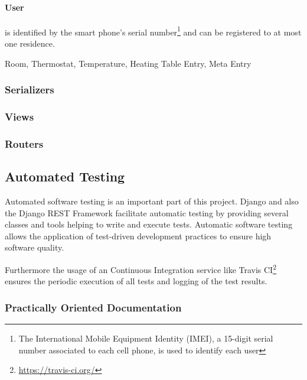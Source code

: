 \paragraph{User}

is identified by the smart phone's serial number\footnote{The International Mobile Equipment Identity (IMEI), a 15-digit serial number associated to each cell phone, is used to identify each user} and can be registered to at most one residence. 

Room, Thermostat, Temperature, Heating Table Entry, Meta Entry




\subsubsection{Serializers}

\subsubsection{Views}

\subsubsection{Routers}



\subsection{Automated Testing}

Automated software testing is an important part of this project. Django and also the Django REST Framework facilitate automatic testing by providing several classes and tools helping to write and execute tests. Automatic software testing allows the application of test-driven development practices to ensure high software quality.

Furthermore the usage of an Continuous Integration service like Travis CI\footnote{\url{https://travis-ci.org/}} ensures the periodic execution of all tests and logging of the test results.

\subsubsection{Practically Oriented Documentation}

